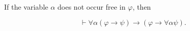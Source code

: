 If the variable $\alpha$ does not occur free in $\varphi$, then

$$\vdash \forall \alpha (\varphi \rightarrow \psi) \rightarrow (\varphi \rightarrow \forall \alpha \psi).$$
